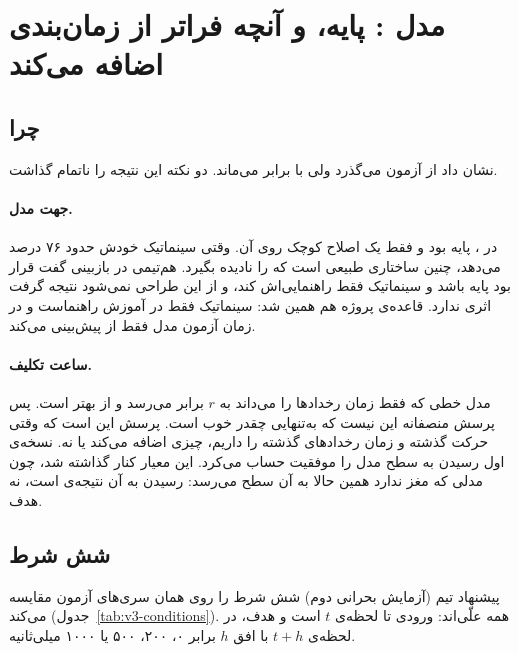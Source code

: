 \FloatBarrier
\section{مدل :  پایه، و آنچه  فراتر از زمان‌بندی اضافه می‌کند}
\label{sec:v3}

\subsection{چرا }

 نشان داد  از آزمون  می‌گذرد ولی  با  برابر می‌ماند. دو نکته این نتیجه را ناتمام گذاشت.

\paragraph{جهت مدل.} در ،  پایه بود و  فقط یک اصلاح کوچک روی آن. وقتی سینماتیک خودش حدود ۷۶ درصد  می‌دهد، چنین ساختاری طبیعی است که  را نادیده بگیرد. هم‌تیمی در بازبینی گفت قرار بود  پایه باشد و سینماتیک فقط راهنمایی‌اش کند، و از این طراحی نمی‌شود نتیجه گرفت  اثری ندارد. قاعده‌ی پروژه هم همین شد: سینماتیک فقط در آموزش راهنماست و در زمان آزمون مدل فقط از  پیش‌بینی می‌کند.

\paragraph{ساعت تکلیف.} مدل خطی  که فقط زمان رخدادها را می‌داند به $r$ برابر  می‌رسد و از  بهتر است. پس پرسش منصفانه این نیست که  به‌تنهایی چقدر خوب است. پرسش این است که وقتی حرکت گذشته و زمان رخدادهای گذشته را داریم،  چیزی اضافه می‌کند یا نه. نسخه‌ی اول  رسیدن به سطح مدل  را موفقیت حساب می‌کرد. این معیار کنار گذاشته شد، چون مدلی که مغز ندارد همین حالا به آن سطح می‌رسد: رسیدن به آن نتیجه‌ی  است، نه هدف.

\subsection{شش شرط}

پیشنهاد تیم (آزمایش بحرانی دوم) شش شرط را روی همان سری‌های آزمون مقایسه می‌کند (جدول~\ref{tab:v3-conditions}). همه علّی‌اند: ورودی تا لحظه‌ی $t$ است و هدف،  در لحظه‌ی $t+h$ با افق $h$ برابر ۰، ۲۰۰، ۵۰۰ یا ۱۰۰۰ میلی‌ثانیه.

